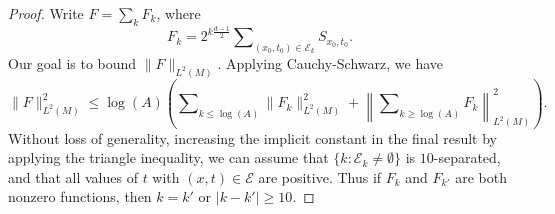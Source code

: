 \begin{proof}
Write $F = \sum_k F_k$, where
%
\begin{equation}
    F_k = 2^{k \frac{d-1}{2}} \sum\nolimits_{(x_0,t_0) \in \mathcal{E}_k} {S\!}_{x_0,t_0}.
\end{equation}
%
Our goal is to bound $\| F \|_{L^2(M)}$. Applying Cauchy-Schwarz, we have
%
\begin{equation} \label{loglossbound}
    \| F \|_{L^2(M)}^2 \leq \log(A) \left( \sum\nolimits_{k \leq \log(A)} \| F_k \|_{L^2(M)}^2 + \left\| \sum\nolimits_{k \geq \log(A)} F_k \right\|_{L^2(M)}^2 \right).
\end{equation}
%
Without loss of generality, increasing the implicit constant in the final result by applying the triangle inequality, we can assume that $\{ k : \mathcal{E}_k \neq \emptyset \}$ is $10$-separated, and that all values of $t$ with $(x,t) \in \mathcal{E}$ are positive. Thus if $F_k$ and $F_{k'}$ are both nonzero functions, then $k = k'$ or $|k - k'| \geq 10$.


\end{proof}
